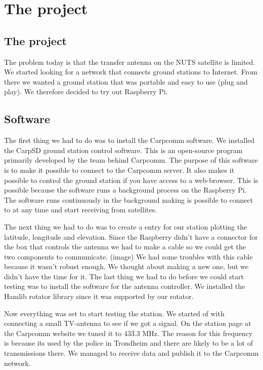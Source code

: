 \chapter{The project}
\label{chap:the_project}


\section {The project}

The problem today is that the transfer antenna on the NUTS satellite is limited. We started looking for a network that connects ground stations to Internet. From there we wanted a ground station that was portable and easy to use (plug and play). We therefore decided to try out Raspberry Pi.

\section {Software}

The first thing we had to do was to install the Carpcomm software. We installed the CarpSD ground station control software. This is an open-source program primarily developed by the team behind Carpcomm. The purpose of this software is to make it possible to connect to the Carpcomm server. It also makes it possible to control the ground station if you have access to a web-browser. This is possible because the software runs a background process on the Raspberry Pi. The software runs continuously in the background making is possible to connect to at any time and start receiving from satellites. \n 

The next thing we had to do was to create a entry for our station plotting the latitude, longitude and elevation.    
Since the Raspberry didn’t have a connector for the box that controls the antenna we had to make a cable so we could get the two components to communicate. (image) 
We had some troubles with this cable because it wasn't robust enough. We thought about making a new one, but we didn't have the time for it. 
The last thing we had to do before we could start testing was to install the software for the antenna controller. We installed the Hamlib rotator library since it was supported by our rotator. \n

Now everything was set to start testing the station. We started of with connecting a small TV-antenna to see if we got a signal. On the station page at the Carpcomm website we tuned it to 433.3 MHz. The reason for this  frequency is because its used by the police in Trondheim and there are likely to be a lot of transmissions there.  We managed to receive data and publish it to the Carpcomm network. \n

